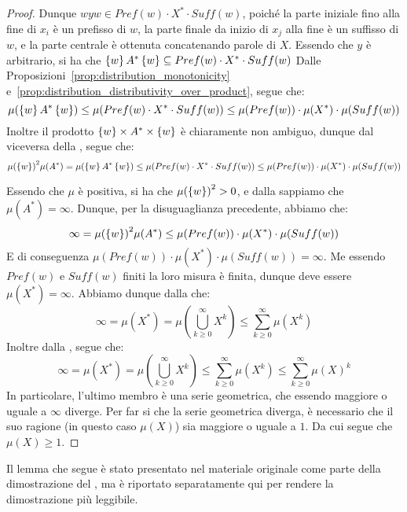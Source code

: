 \begin{proof}
  Dunque \(wyw \in Pref(w)\cdot X^* \cdot Suff(w)\), poiché la parte iniziale fino alla fine di \(x_i\) è un prefisso di \(w\), la parte finale da inizio di \(x_j\) alla fine è un suffisso di \(w\), e la parte centrale è ottenuta concatenando parole di \(X\).
  Essendo che \(y\) è arbitrario, si ha che \(\set{w}A^*\set{w} \subseteq Pref(w)\cdot X^* \cdot Suff(w)\)
  Dalle Proposizioni~\ref{prop:distribution_monotonicity} e~\ref{prop:distribution_distributivity_over_product}, segue che:
  \[\mu(\set{w}A^*\set{w}) \leq \mu(Pref(w)\cdot X^* \cdot Suff(w)) \leq \mu(Pref(w))\cdot \mu(X^*)\cdot \mu(Suff(w))\]
  Inoltre il prodotto \(\set{w}\times A^* \times \set{w}\) è chiaramente non ambiguo, dunque dal viceversa della , segue che:
  \[{\mu(\set{w})}^2\mu(A^*)=\mu(\set{w}A^*\set{w}) \leq \mu(Pref(w)\cdot X^* \cdot Suff(w)) \leq \mu(Pref(w))\cdot \mu(X^*)\cdot \mu(Suff(w))\]

  Essendo che \(\mu\) è positiva, si ha che \({\mu(\set{w})}^2 > 0\), e dalla  sappiamo che \(\mu(A^*) = \infty\).
  Dunque, per la disuguaglianza precedente, abbiamo che:
  \[\infty = {\mu(\set{w})}^2\mu(A^*) \leq \mu(Pref(w))\cdot \mu(X^*)\cdot \mu(Suff(w))\]
  E di conseguenza \(\mu(Pref(w))\cdot \mu(X^*)\cdot \mu(Suff(w)) = \infty\).
  Me essendo \(Pref(w)\) e \(Suff(w)\) finiti la loro misura è finita, dunque deve essere \(\mu(X^*) = \infty\).
  Abbiamo dunque dalla  che:
  \[\infty = \mu(X^*) = \mu(\bigcup_{k \geq 0}^{\infty} X^k) \leq \sum_{k \geq 0}^{\infty} \mu(X^k)\]
  Inoltre dalla , segue che:
  \[\infty = \mu(X^*) = \mu(\bigcup_{k \geq 0}^{\infty} X^k) \leq \sum_{k \geq 0}^{\infty} \mu(X^k)\leq \sum_{k \geq 0}^{\infty} {\mu(X)}^k\]
  In particolare, l'ultimo membro è una serie geometrica, che essendo maggiore o uguale a \(\infty\) diverge.
  Per far si che la serie geometrica diverga, è necessario che il suo ragione (in questo caso \(\mu(X)\)) sia maggiore o uguale a \(1\).
  Da cui segue che \(\mu(X) \geq 1\).
\end{proof}

\begin{warning}{}
  Il lemma che segue è stato presentato nel materiale originale come parte della dimostrazione del , ma è riportato separatamente qui per rendere la dimostrazione più leggibile.
\end{warning}

